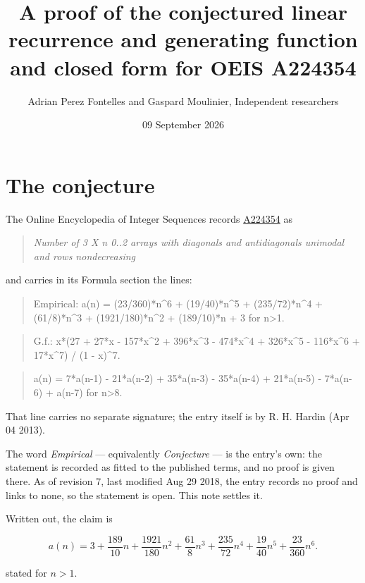 \documentclass[11pt]{article}
\title{A proof of the conjectured linear recurrence and generating function and closed form for OEIS A224354}
\author{Adrian Perez Fontelles and Gaspard Moulinier, Independent researchers}
\date{09 September 2026}
\theoremstyle{definition}
\begin{document}
\maketitle
\section{The conjecture}

The Online Encyclopedia of Integer Sequences records \href{https://oeis.org/A224354}{A224354} as

\begin{quote}\itshape Number of 3 X n 0..2 arrays with diagonals and antidiagonals unimodal and rows nondecreasing\end{quote}

and carries in its Formula section the lines:

\begin{quote}\ttfamily Empirical: a(n) = (23/360)*n\textasciicircum{}6 + (19/40)*n\textasciicircum{}5 + (235/72)*n\textasciicircum{}4 + (61/8)*n\textasciicircum{}3 + (1921/180)*n\textasciicircum{}2 + (189/10)*n + 3 for n>1.\end{quote}

\begin{quote}\ttfamily G.f.: x*(27 + 27*x - 157*x\textasciicircum{}2 + 396*x\textasciicircum{}3 - 474*x\textasciicircum{}4 + 326*x\textasciicircum{}5 - 116*x\textasciicircum{}6 + 17*x\textasciicircum{}7) / (1 - x)\textasciicircum{}7.\end{quote}

\begin{quote}\ttfamily a(n) = 7*a(n-1) - 21*a(n-2) + 35*a(n-3) - 35*a(n-4) + 21*a(n-5) - 7*a(n-6) + a(n-7) for n>8.\end{quote}

That line carries no separate signature; the entry itself is by R. H. Hardin (Apr 04 2013).

The word {\itshape Empirical} --- equivalently {\itshape Conjecture} --- is the entry's own: the statement is recorded as fitted to the published terms, and no proof is given there. As of revision 7, last modified Aug 29 2018, the entry records no proof and links to none, so the statement is open. This note settles it.

Written out, the claim is

\[a(n) = 3 + \frac{189}{10}n + \frac{1921}{180}n^{2} + \frac{61}{8}n^{3} + \frac{235}{72}n^{4} + \frac{19}{40}n^{5} + \frac{23}{360}n^{6}.\]

stated for $n > 1$.
\end{document}
